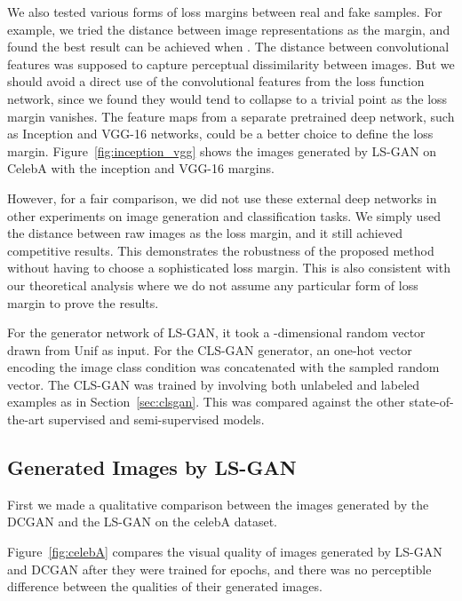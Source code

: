 \documentclass[11pt,fullpage, letterpaper,twoside]{article}
\newcommand{\1}[1]{\mathds{1}_{\left[#1\right]}}
\begin{document}
We also tested various forms of loss margins  between real and fake samples.
For example, we tried the  distance between image representations as the margin, and found the best result can be achieved when .
The distance between convolutional features was supposed to capture perceptual dissimilarity between images.
But we should avoid a direct use of the convolutional features from the loss function network, since we found they would tend to collapse to a trivial point as the loss margin vanishes.
The feature maps from a separate pretrained deep network, such as Inception and VGG-16 networks, could be a better choice to define the loss margin. Figure~\ref{fig:inception_vgg} shows the images generated by LS-GAN on CelebA with the inception and VGG-16 margins.

However, for a fair comparison, we did not use these external deep networks in other experiments on image generation and classification tasks. We simply used the distance between raw images as the loss margin, and it still achieved competitive results. This demonstrates the robustness of the proposed method without having to choose a sophisticated loss margin. This is also consistent with our theoretical analysis where we do not assume any particular form of loss margin to prove the results.



For the generator network of LS-GAN, it took a -dimensional random vector drawn from Unif as input. For the
CLS-GAN generator, an one-hot vector encoding the image class condition was concatenated with the sampled random vector. The CLS-GAN was trained by involving both unlabeled and labeled examples as in Section~\ref{sec:clsgan}. This was compared against the other state-of-the-art supervised and semi-supervised models.

\subsection{Generated Images by LS-GAN}

First we made a qualitative comparison between the images generated by the DCGAN and the LS-GAN on the celebA dataset.

Figure~\ref{fig:celebA} compares the visual quality of images generated by LS-GAN and DCGAN after they were trained for  epochs, and
there was no perceptible difference between the qualities of their generated images.
\end{document}
